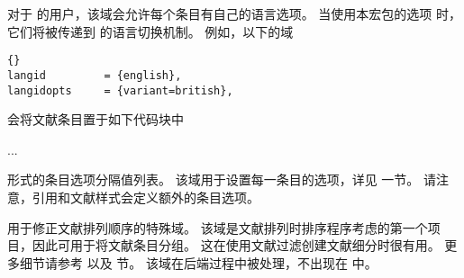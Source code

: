 \begin{fieldlist}

对于  的用户，该域会允许每个条目有自己的语言选项。
当使用本宏包的选项  时，它们将被传递到  的语言切换机制。
例如，以下的域
\begin{lstlisting}[style=bibtex]{}
langid         = {english},
langidopts     = {variant=british},
\end{lstlisting}
%
会将文献条目置于如下代码块中
\begin{ltxexample}
\english[variant=british]
...
\endenglish
\end{ltxexample}
%




\keyval 形式的条目选项分隔值列表。
该域用于设置每一条目的选项，详见  一节。
请注意，引用和文献样式会定义额外的条目选项。




用于修正文献排列顺序的特殊域。
该域是文献排列时排序程序考虑的第一个项目，因此可用于将文献条目分组。
这在使用文献过滤创建文献细分时很有用。
更多细节请参考  以及  节。
该域在后端过程中被处理，不出现在  中。





\end{fieldlist}

